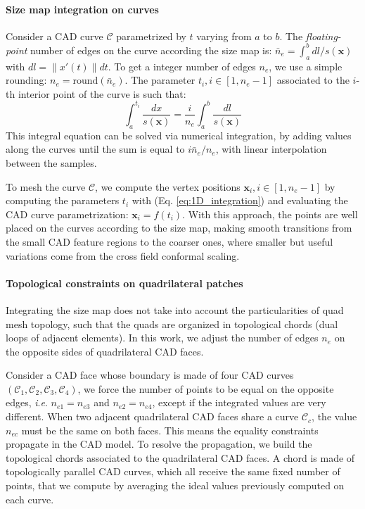 \documentclass[AMA,STIX1COL]{WileyNJD-v2}
\newcommand{\vx}{\ensuremath{\mathbf{x}}}
\newcommand{\curve}{\ensuremath{\mathcal{C}}}
\newcommand{\norm}[1]{\left\lVert#1\right\rVert}
\newcommand{\ie}{\textit{i}.\textit{e}. }
\newcommand\reqt[1]{Eq. \ref{#1}}
\begin{document}
{\paragraph{Size map integration on curves}

Consider a CAD curve $\curve$ parametrized
by $t$ varying from $a$ to $b$. The \emph{floating-point} number of edges on
the curve according the size map is:
$\bar{n}_e = \int_{a}^b dl / s(\vx)$ with $dl=\norm{x'(t)}dt$. To get a integer number
of edges $n_e$, we use a simple rounding: $n_e = \text{round}(\bar{n}_e)$.
The parameter $t_i, i \in [1,n_e-1] $ associated to the $i$-th interior point of the curve
is such that:
\begin{equation}
\int_{a}^{t_i} \frac{dx}{s(\vx)} = \frac{i}{n_e} \int_{a}^b \frac{dl}{s(\vx)} 
    \label{eq:1D_integration}
\end{equation}
This integral equation can be solved via numerical integration, by adding
values along the curves until the sum is equal to $i \bar{n}_e / n_e$, with linear
interpolation between the samples. 

To mesh the curve $\curve$, we compute the vertex positions $\vx_i, i \in [1,n_e-1]$
by computing the parameters $t_i$ with (\reqt{eq:1D_integration}) and evaluating
the CAD curve parametrization: $\vx_i = f(t_i)$. With this approach, the points
are well placed on the curves according to the size map, making smooth transitions
from the small CAD feature regions to the coarser ones, where smaller but 
useful variations come from the cross field conformal scaling.

\paragraph{Topological constraints on quadrilateral patches}

Integrating the size map does not take into account the particularities of
quad mesh topology, such that the quads are organized in topological
chords (dual loops of adjacent elements). In this work, we adjust the
number of edges $n_e$ on the opposite sides of quadrilateral CAD faces.

Consider a CAD face whose boundary is made of
four CAD curves $(\curve_1,\curve_2,\curve_3,\curve_4)$, we force the number of
points to be equal on the opposite edges, \ie $n_{e1}=n_{e3}$ and
$n_{e2}=n_{e4}$, except if the integrated values are very different.
When two adjacent quadrilateral CAD faces share a curve $\curve_c$,
the value $n_{ec}$ must be the same on both faces. This means
the equality constraints propagate in the CAD model.
To resolve the propagation,
we build the topological chords associated to the quadrilateral CAD faces. A
chord is made of topologically parallel CAD curves, which all receive the same
fixed number of points, that we compute by averaging the ideal values
previously computed on each curve.

}
\end{document}
